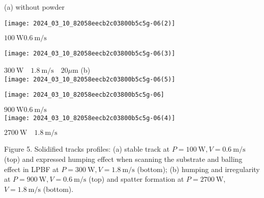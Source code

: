 \documentclass[10pt]{article}
\begin{document}
(a) without powder

\begin{center}
\texttt{[image: 2024\_03\_10\_82058eecb2c03800b5c5g-06(2)]}
\end{center}

$100 \mathrm{~W} 0.6 \mathrm{~m} / \mathrm{s}$

\begin{center}
\texttt{[image: 2024\_03\_10\_82058eecb2c03800b5c5g-06(3)]}
\end{center}

$300 \mathrm{~W} \quad 1.8 \mathrm{~m} / \mathrm{s} \quad 20 \mu \mathrm{m}$ (b)\\
\texttt{[image: 2024\_03\_10\_82058eecb2c03800b5c5g-06(5)]}

\begin{center}
\texttt{[image: 2024\_03\_10\_82058eecb2c03800b5c5g-06]}
\end{center}

$900 \mathrm{~W} 0.6 \mathrm{~m} / \mathrm{s}$\\
\texttt{[image: 2024\_03\_10\_82058eecb2c03800b5c5g-06(4)]}

$2700 \mathrm{~W} \quad 1.8 \mathrm{~m} / \mathrm{s}$

Figure 5. Solidified tracks profiles: (a) stable track at $P=100 \mathrm{~W}, V=0.6 \mathrm{~m} / \mathrm{s}$ (top) and expressed humping effect when scanning the substrate and balling effect in LPBF at $P=300 \mathrm{~W}, V=1.8 \mathrm{~m} / \mathrm{s}$ (bottom); (b) humping and irregularity at $P=900 \mathrm{~W}, V=0.6 \mathrm{~m} / \mathrm{s}$ (top) and spatter formation at $P=2700 \mathrm{~W}$, $V=1.8 \mathrm{~m} / \mathrm{s}$ (bottom).
\end{document}
